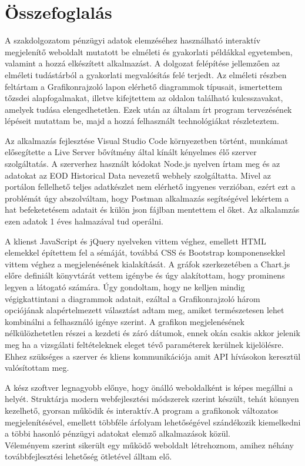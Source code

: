 
\section{Összefoglalás}

A szakdolgozatom pénzügyi adatok elemzéséhez használható interaktív megjelenítő weboldalt mutatott be elméleti és gyakorlati példákkal egyetemben, valamint a hozzá elkészített alkalmazást. A dolgozat felépítése jellemzően az elméleti tudástárból a gyakorlati megvalósítás felé terjedt. Az elméleti részben feltártam a Grafikonrajzoló lapon elérhető diagrammok típusait, ismertettem tőzsdei alapfogalmakat, illetve kifejtettem az oldalon található kulcsszavakat, amelyek tudása elengedhetetlen. Ezek után az általam írt program tervezésének lépéseit mutattam be, majd a hozzá felhasznált technológiákat részleteztem.

	Az alkalmazás fejlesztése Visual Studio Code környezetben történt, munkámat elősegítette a Live Server bővítmény által kínált kényelmes élő szerver szolgáltatás. A szerverhez használt kódokat Node.js nyelven írtam meg és az adatokat az EOD Historical Data nevezetű webhely szolgáltatta. Mivel az portálon fellelhető teljes adatkészlet nem elérhető ingyenes verzióban, ezért ezt a problémát úgy abszolváltam, hogy Postman alkalmazás segítségével lekértem a hat befeketetésem adatait és külön json fájlban mentettem el őket. Az alkalamzás ezen adatok 1 éves halmazával tud operálni. 

	A klienst JavaScript és jQuery nyelveken vittem véghez, emellett HTML elemekkel építettem fel a sémáját, továbbá CSS és Bootstrap komponensekkel vittem véghez a megjelenésének kialakítását. A gráfok szerkezetében a Chart.js előre definiált könyvtárát vettem igénybe és úgy alakítottam, hogy prominens legyen a látogató számára. Úgy gondoltam, hogy ne kelljen mindig végigkattintani a diagrammok adatait, ezáltal a Grafikonrajzoló három opciójának alapértelmezett választást adtam meg, amiket természetesen lehet kombinálni a felhasználó igénye szerint. A grafikon megjelenésének nélkülözhetetlen részei a kezdeti és záró dátumok, ennek okán csakis akkor jelenik meg ha a vizsgálati feltételeknek eleget tévő paraméterek kerülnek kijelölésre. Ehhez szükséges a szerver és kliens kommunikációja amit API hívásokon keresztül valósítottam meg.

	A kész szoftver legnagyobb előnye, hogy önálló weboldalként is képes megállni a helyét. Struktárja modern webfejlesztési módszerek szerint készült, tehát könnyen kezelhető, gyorsan működik és interaktív.A program a grafikonok változatos megjelenítésével, emellett többféle árfolyam lehetőségével szándékozik kiemelkedni a többi hasonló pénzügyi adatokat elemző alkalmazások közül. \\
Véleményem szerint sikerült egy működő weboldalt létrehoznom, amihez néhány továbbfejlesztési lehetőség ötletével álltam elő.

